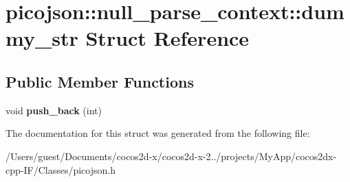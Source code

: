 \hypertarget{structpicojson_1_1null__parse__context_1_1dummy__str}{\section{picojson\-:\-:null\-\_\-parse\-\_\-context\-:\-:dummy\-\_\-str Struct Reference}
\label{structpicojson_1_1null__parse__context_1_1dummy__str}
}
\subsection*{Public Member Functions}
\begin{DoxyCompactItemize}
\item 
\hypertarget{structpicojson_1_1null__parse__context_1_1dummy__str_ac2b5c5eca1014b268b4c5a2a87d8923c}{void {\bfseries push\-\_\-back} (int)}\label{structpicojson_1_1null__parse__context_1_1dummy__str_ac2b5c5eca1014b268b4c5a2a87d8923c}

\end{DoxyCompactItemize}


The documentation for this struct was generated from the following file\-:\begin{DoxyCompactItemize}
\item 
/\-Users/guest/\-Documents/cocos2d-\/x/cocos2d-\/x-\/2../projects/\-My\-App/cocos2dx-\/cpp-\/\-I\-F/\-Classes/picojson.\-h\end{DoxyCompactItemize}
